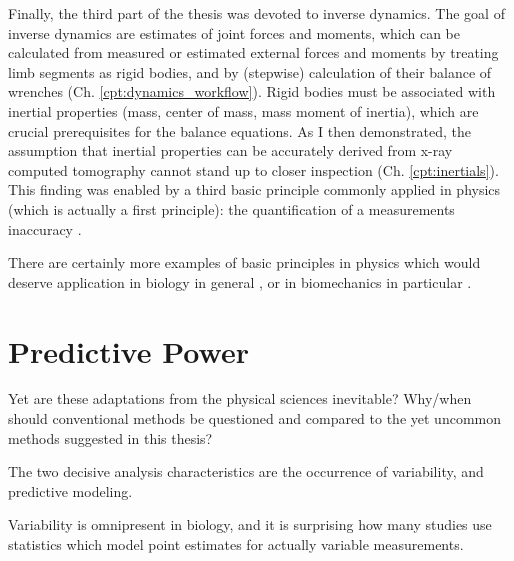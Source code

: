Finally, the third part of the thesis was devoted to inverse dynamics.
The goal of inverse dynamics are estimates of joint forces and moments, which can be calculated from measured or estimated external forces and moments by treating limb segments as rigid bodies, and by (stepwise) calculation of their balance of wrenches (Ch. \ref{cpt:dynamics_workflow}).
Rigid bodies must be associated with inertial properties (mass, center of mass, mass moment of inertia), which are crucial prerequisites for the balance equations.
As I then demonstrated, the assumption that inertial properties can be accurately derived from x-ray computed tomography cannot stand up to closer inspection (Ch. \ref{cpt:inertials}).
This finding was enabled by a third basic principle commonly applied in physics (which is actually a first principle): the quantification of a measurements inaccuracy \citep{Hughes2010}.


There are certainly more examples of basic principles in physics which would deserve application in biology in general \citep[e.g. Quantum Cognition,][]{Busemeyer2015,Aerts1995}, or in biomechanics in particular \citep[e.g. wrenches and quaternions,][]{Dumas2004}.


\section{Predictive Power}
\label{sec:orgf30c657}
Yet are these adaptations from the physical sciences inevitable?
Why/when should conventional methods be questioned and compared to the yet uncommon methods suggested in this thesis?


The two decisive analysis characteristics are the occurrence of variability, and predictive modeling.

Variability is omnipresent in biology, and it is surprising how many studies use statistics which model point estimates for actually variable measurements.

